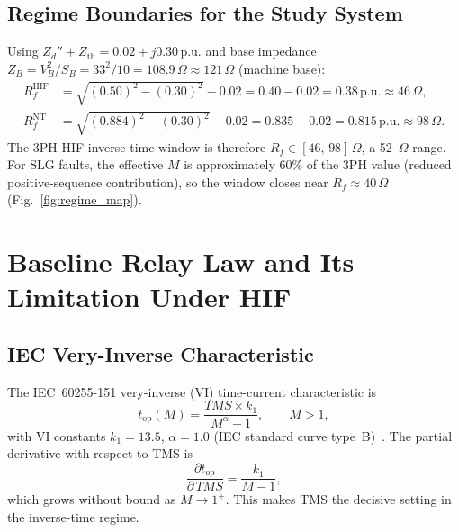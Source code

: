 \documentclass[10pt,journal,twoside]{IEEEtran}
\newcommand{\pu}{\,\text{p.u.}}
\newcommand{\Rf}{R_{\!f}}
\newcommand{\tms}{TMS}
\begin{document}
\subsection{Regime Boundaries for the Study System}
\label{sec:regime:study}

Using $Z_d'' + Z_{\mathrm{th}} = 0.02 + j0.30\pu$ and base impedance
$Z_B = V_B^2/S_B = 33^2/10 = 108.9\,\Omega \approx 121\,\Omega$ (machine base):
\begin{align}
R_f^{\mathrm{HIF}} &= \sqrt{(0.50)^2 - (0.30)^2} - 0.02
   = 0.40 - 0.02 = 0.38\pu \approx 46\,\Omega, \label{eq:Rfhif_num} \\
R_f^{\mathrm{NT}}  &= \sqrt{(0.884)^2 - (0.30)^2} - 0.02
   = 0.835 - 0.02 = 0.815\pu \approx 98\,\Omega. \label{eq:RfNT_num}
\end{align}
The 3PH HIF inverse-time window is therefore $\Rf \in [46,\,98]\,\Omega$,
a 52~$\Omega$ range.  For SLG faults, the effective $M$ is approximately
60\% of the 3PH value (reduced positive-sequence contribution), so the
window closes near $R_f \approx 40\,\Omega$ (Fig.~\ref{fig:regime_map}).

\section{Baseline Relay Law and Its Limitation Under HIF}
\label{sec:baseline}

\subsection{IEC Very-Inverse Characteristic}
\label{sec:baseline:vi}

The IEC~60255-151 very-inverse (VI) time-current characteristic is
\begin{equation}
t_{\mathrm{op}}(M) = \frac{\tms \times k_1}{M^\alpha - 1},
\qquad M > 1,
\label{eq:tVI}
\end{equation}
with VI constants $k_1 = 13.5$, $\alpha = 1.0$ (IEC standard
curve type~B)~\cite{IEC60255-151}.
The partial derivative with respect to TMS is
\begin{equation}
\frac{\partial t_{\mathrm{op}}}{\partial\,\tms}
  = \frac{k_1}{M - 1},
\label{eq:dtdTMS}
\end{equation}
which grows without bound as $M \to 1^+$.  This makes TMS the decisive
setting in the inverse-time regime.
\end{document}
